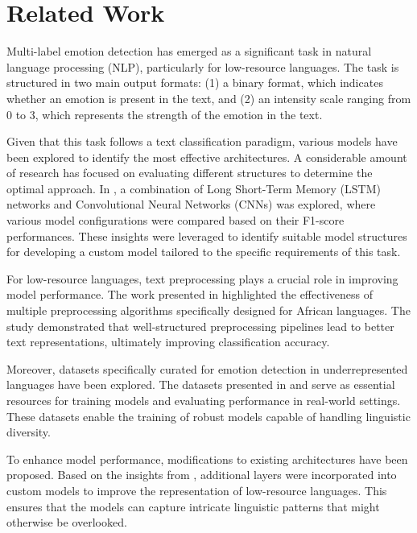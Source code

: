 \section{Related Work}
Multi-label emotion detection has emerged as a significant task in natural language processing (NLP), particularly for low-resource languages. The task is structured in two main output formats: (1) a binary format, which indicates whether an emotion is present in the text, and (2) an intensity scale ranging from 0 to 3, which represents the strength of the emotion in the text.

Given that this task follows a text classification paradigm, various models have been explored to identify the most effective architectures. A considerable amount of research has focused on evaluating different structures to determine the optimal approach. In \cite{wang2016dimensional}, a combination of Long Short-Term Memory (LSTM) networks and Convolutional Neural Networks (CNNs) was explored, where various model configurations were compared based on their F1-score performances. These insights were leveraged to identify suitable model structures for developing a custom model tailored to the specific requirements of this task.


For low-resource languages, text preprocessing plays a crucial role in improving model performance. The work presented in \cite{muhammad2023semeval} highlighted the effectiveness of multiple preprocessing algorithms specifically designed for African languages. The study demonstrated that well-structured preprocessing pipelines lead to better text representations, ultimately improving classification accuracy.

Moreover, datasets specifically curated for emotion detection in underrepresented languages have been explored. The datasets presented in \cite{muhammad2025brighterbridginggaphumanannotated} and \cite{belay-etal-2025-evaluating} serve as essential resources for training models and evaluating performance in real-world settings. These datasets enable the training of robust models capable of handling linguistic diversity.

To enhance model performance, modifications to existing architectures have been proposed. Based on the insights from \cite{wang2016dimensional}, additional layers were incorporated into custom models to improve the representation of low-resource languages. This ensures that the models can capture intricate linguistic patterns that might otherwise be overlooked.